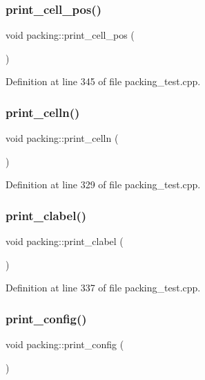 \subsubsection{\texorpdfstring{print\+\_\+cell\+\_\+pos()}{print\_cell\_pos()}}
{\footnotesize\ttfamily void packing\+::print\+\_\+cell\+\_\+pos (\begin{DoxyParamCaption}{ }\end{DoxyParamCaption})}



Definition at line 345 of file packing\+\_\+test.\+cpp.

\mbox{\label{classpacking_a874b2bf73b23b4e051c293f68e25e6c9}} 
\subsubsection{\texorpdfstring{print\+\_\+celln()}{print\_celln()}}
{\footnotesize\ttfamily void packing\+::print\+\_\+celln (\begin{DoxyParamCaption}{ }\end{DoxyParamCaption})}



Definition at line 329 of file packing\+\_\+test.\+cpp.

\mbox{\label{classpacking_ac064578aca74b4916463599a9fbdf2af}} 
\subsubsection{\texorpdfstring{print\+\_\+clabel()}{print\_clabel()}}
{\footnotesize\ttfamily void packing\+::print\+\_\+clabel (\begin{DoxyParamCaption}{ }\end{DoxyParamCaption})}



Definition at line 337 of file packing\+\_\+test.\+cpp.

\mbox{\label{classpacking_aafb35d8f7a0901ecaad05d3ea0e8ccf8}} 
\subsubsection{\texorpdfstring{print\+\_\+config()}{print\_config()}}
{\footnotesize\ttfamily void packing\+::print\+\_\+config (\begin{DoxyParamCaption}{ }\end{DoxyParamCaption})}



